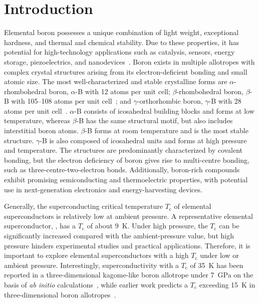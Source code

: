 \clearpage
\section{Introduction}
\label{2_introduction}

Elemental boron possesses a unique combination of light weight, exceptional hardness, and thermal and chemical stability.
Due to these properties, it has potential for high-technology applications such as catalysis, sensors, energy storage, piezoelectrics, and nanodevices~\cite{ranjan2024properties}.
Boron exists in multiple allotropes with complex crystal structures arising from its electron-deficient bonding and small atomic size.
The most well-characterized and stable crystalline forms are $\alpha$-rhombohedral boron, $\alpha$-B with 12 atoms per unit cell;
$\beta$-rhombohedral boron, $\beta$-B with 105--108 atoms per unit cell~\cite{widom2008symmetry};
and $\gamma$-orthorhombic boron, $\gamma$-B with 28 atoms per unit cell~\cite{an2016new}.
$\alpha$-B consists of  icosahedral building blocks and forms at low temperature,
whereas $\beta$-B has the same structural motif, but also includes interstitial boron atoms.
$\beta$-B forms at room temperature and is the most stable structure.
$\gamma$-B is also composed of  icosahedral units and forms at high pressure and
temperature.
The structures are predominantly characterized by covalent bonding,
but the electron deficiency of boron gives rise to multi-centre bonding,
such as three-centre-two-electron bonds.
Additionally, boron-rich compounds exhibit promising semiconducting and thermoelectric properties,
with potential use in next-generation electronics and energy-harvesting devices.

Generally, the superconducting critical temperature $T_\mathrm{c}$ of elemental superconductors is relatively low at ambient pressure.
A representative elemental superconductor, , has a $T_\mathrm{c}$ of about \qty{9}{K}.
Under high pressure, the $T_\mathrm{c}$ can be significantly increased compared with the ambient-pressure value,
but high pressure hinders experimental studies and practical applications.
Therefore,
it is important to explore elemental superconductors with a high $T_\mathrm{c}$ under low or ambient pressure.
Interestingly, superconductivity with a $T_\mathrm{c}$ of \qty{35}{K} has been reported in a three-dimensional kagome-like boron allotrope under \qty{7}{GPa} on the basis of \textit{ab initio} calculations~\cite{ouyang2025superconductivity},
while earlier work predicts a $T_\mathrm{c}$ exceeding \qty{15}{K} in three-dimensional boron allotropes~\cite{zhang2020superconducting}.

